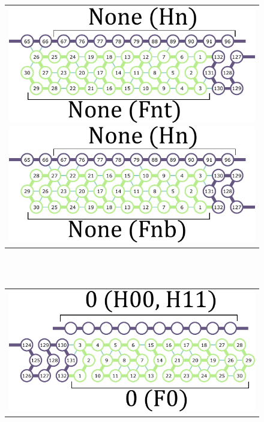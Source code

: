 \documentclass[runningheads]{llncs}
\begin{document}
\begin{figure}[tb]
\begin{tabular}{c}
 \begin{minipage}{0.5\linewidth}
  \centering
   \includegraphics[width=0.8\linewidth]{fig/svg/Fnt_1.pdf}
 \end{minipage}
 
 \begin{minipage}{0.5\linewidth}
  \centering
   \includegraphics[width=0.8\linewidth]{fig/svg/Fnb_1.pdf}

 \end{minipage}
 \end{tabular}
\ \\
\ \\
\begin{tabular}{c}
 \begin{minipage}{0.5\linewidth}
  \centering
   \includegraphics[width=0.8\linewidth]{fig/svg/F0_1.pdf}
 \end{minipage}
 

\end{tabular}
\end{figure}
\end{document}
